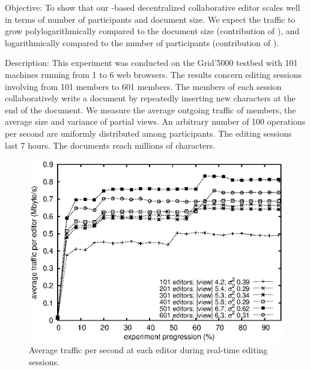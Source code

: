 \begin{asparadesc}
\item [Objective:] To show that our \LSEQ-based decentralized collaborative
  editor scales well in terms of number of participants and document size. We
  expect the traffic to grow polylogarithmically compared to the document size
  (contribution of \LSEQ), and logarithmically compared to the number of
  participants (contribution of \SPRAY).
\item [Description:] This experiment was conducted on the Grid'5000 testbed with
  101 machines running from 1 to 6 web browsers. The results concern editing
  sessions involving from 101 members to 601 members. The members of each
  session collaboratively write a document by repeatedly inserting new
  characters at the end of the document. We measure the average outgoing traffic
  of members, the average size and variance of partial views. An arbitrary
  number of 100 operations per second are uniformly distributed among
  participants. The editing sessions last 7 hours. The documents reach millions
  of characters.

\begin{figure}
  \centering
  \includegraphics[width=\FIGUREWIDTH\textwidth]{./img/communication.eps}
  \caption{\label{fig:traffic} Average traffic per second at each editor during
    real-time editing sessions.}
\end{figure}


\end{asparadesc}
